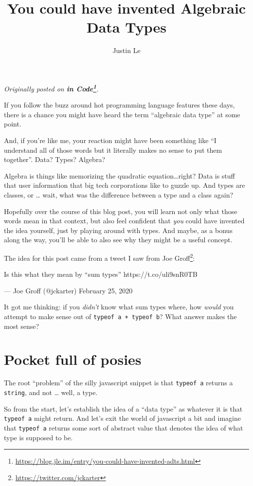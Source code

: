\documentclass[]{article}
\title{You could have invented Algebraic Data Types}
\author{Justin Le}
\renewcommand{\href}[2]{#2\footnote{\url{#1}}}
\begin{document}
\maketitle

\emph{Originally posted on
\textbf{\href{https://blog.jle.im/entry/you-could-have-invented-adts.html}{in
Code}}.}

If you follow the buzz around hot programming language features these days,
there is a chance you might have heard the term ``algebraic data type'' at some
point.

And, if you're like me, your reaction might have been something like ``I
understand all of those words but it literally makes no sense to put them
together''. Data? Types? Algebra?

Algebra is things like memorizing the quadratic equation\ldots right? Data is
stuff that user information that big tech corporations like to guzzle up. And
types are classes, or \ldots{} wait, what was the difference between a type and
a class again?

Hopefully over the course of this blog post, you will learn not only what those
words mean in that context, but also feel confident that \emph{you} could have
invented the idea yourself, just by playing around with types. And maybe, as a
bonus along the way, you'll be able to also see why they might be a useful
concept.

The idea for this post came from a tweet I saw from
\href{https://twitter.com/jckarter}{Joe Groff}:

Is this what they mean by ``sum types'' https://t.co/uli9snR0TB

--- Joe Groff (@jckarter) February 25, 2020

It got me thinking: if you \emph{didn't} know what sum types where, how
\emph{would} you attempt to make sense out of \texttt{typeof\ a\ +\ typeof\ b}?
What answer makes the most sense?

\hypertarget{pocket-full-of-posies}{%
\section{Pocket full of posies}\label{pocket-full-of-posies}}

The root ``problem'' of the silly javascript snippet is that \texttt{typeof\ a}
returns a \texttt{string}, and not \ldots{} well, a type.

So from the start, let's establish the idea of a ``data type'' as whatever it is
that \texttt{typeof\ a} might return. And let's exit the world of javascript a
bit and imagine that \texttt{typeof\ a} returns some sort of abstract value that
denotes the idea of what type is supposed to be.
\end{document}
